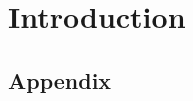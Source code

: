 




\begin{titlingpage}
  
  
\end{titlingpage}


\tableofcontents
\chapter{Introduction}\label{par:introduction}



\begingroup
	\raggedright
  \printbibliography
\endgroup
\cleardoublepage

\begin{appendices}
  \chapter{Appendix}\label{PART:Appendix}
  
\end{appendices}

